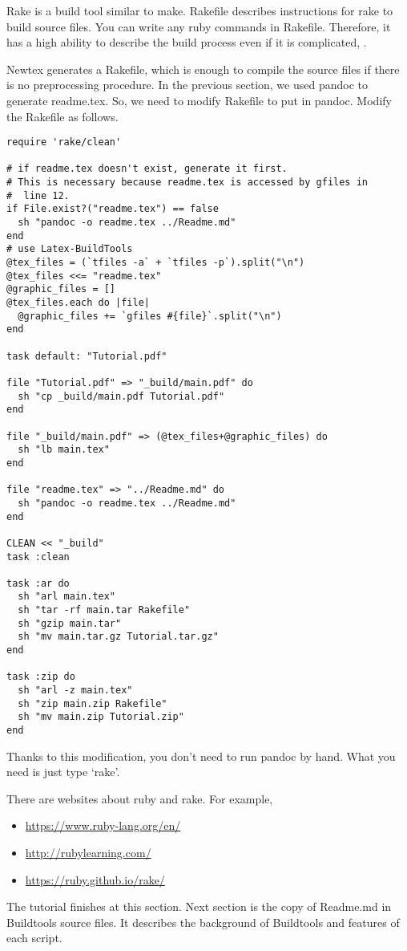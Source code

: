 Rake is a build tool similar to make.
Rakefile describes instructions for rake to build source files.
You can write any ruby commands in Rakefile.
Therefore, it has a high ability to describe the build process even if it is complicated, .

Newtex generates a Rakefile, which is enough to compile the source files if there is no preprocessing procedure.
In the previous section, we used pandoc to generate readme.tex.
So, we need to modify Rakefile to put in pandoc.
Modify the Rakefile as follows.
\begin{verbatim}
require 'rake/clean'

# if readme.tex doesn't exist, generate it first.
# This is necessary because readme.tex is accessed by gfiles in
#  line 12.
if File.exist?("readme.tex") == false
  sh "pandoc -o readme.tex ../Readme.md"
end
# use Latex-BuildTools
@tex_files = (`tfiles -a` + `tfiles -p`).split("\n")
@tex_files <<= "readme.tex"
@graphic_files = []
@tex_files.each do |file|
  @graphic_files += `gfiles #{file}`.split("\n")
end

task default: "Tutorial.pdf"

file "Tutorial.pdf" => "_build/main.pdf" do
  sh "cp _build/main.pdf Tutorial.pdf"
end

file "_build/main.pdf" => (@tex_files+@graphic_files) do
  sh "lb main.tex"
end

file "readme.tex" => "../Readme.md" do
  sh "pandoc -o readme.tex ../Readme.md"
end

CLEAN << "_build"
task :clean

task :ar do
  sh "arl main.tex"
  sh "tar -rf main.tar Rakefile"
  sh "gzip main.tar"
  sh "mv main.tar.gz Tutorial.tar.gz"
end

task :zip do
  sh "arl -z main.tex"
  sh "zip main.zip Rakefile"
  sh "mv main.zip Tutorial.zip"
end
\end{verbatim}

Thanks to this modification, you don't need to run pandoc by hand.
What you need is just type `rake'.

There are websites about ruby and rake.
For example,
\begin{itemize}
\item \url{https://www.ruby-lang.org/en/}
\item \url{http://rubylearning.com/}
\item \url{https://ruby.github.io/rake/}
\end{itemize}

The tutorial finishes at this section.
Next section is the copy of Readme.md in Buildtools source files.
It describes the background of Buildtools and features of each script.
